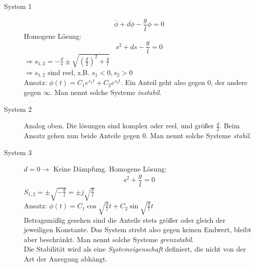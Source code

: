 \documentclass[12pt,a4paper,ngerman]{scrartcl}
\begin{document}
\begin{description}
\item[System 1]
\[\ddot{\phi}+d\dot{\phi}-\frac{g}{l}\phi=0\]
Homogene Lösung:
\[
s^2+ds-\frac{g}{l}=0
\]
$\Rightarrow s_{1,2}=-\frac{d}{s}\pm \sqrt{(\frac{d}{2})^2+\frac{g}{l}}$\\
$\Rightarrow s_{1,2}$ sind reel, z.B. $s_1 < 0, s_2 >0$\\
Ansatz: $\phi(t)=C_1e^{s_1t}+C_2e^{s_2t}$. Ein Anteil geht also gegen 0, der andere gegen $\infty$. Man nennt solche Systeme \emph{instabil}.
\item[System 2] 
Analog oben. Die lösungen sind komplex oder reel, und größer $\frac{d}{2}$. Beim Ansatz gehen nun beide Anteile gegen 0. Man nennt solche Systeme \emph{stabil}.
\item[System 3] $d=0 \rightarrow $ Keine Dämpfung. Homogene Lösung:
\[
s^2+\frac{g}{l}=0
\] 
$S_{1,2}=\pm \sqrt{-\frac{g}{l}}=\pm j\sqrt{\frac{g}{l}}$\\
Ansatz: $\phi(t)=C_1\cos{\sqrt{\frac{g}{l}}t}+C_2\sin{\sqrt{\frac{g}{l}}t}$\\
Betragsmäßig gesehen sind die Anteile stets größer oder gleich der jeweiligen Konstante. Das System strebt also gegen keinen Endwert, bleibt aber beschränkt. Man nennt solche Systeme \emph{grenzstabil}.\\
Die Stabilität wird als eine \emph{Systemeigenschaft} definiert, die nicht von der Art der Anregung abhängt. 

\end{description}
\end{document}
